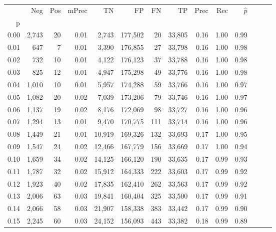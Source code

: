 \begin{tabular}{rrrrrrrrrrrrrr}
\toprule
{} &    Neg &  Pos & mPrec &       TN &       FP &      FN &      TP &  Prec &   Rec & $\hat{p}$ \\
p    &        &      &       &          &          &         &         &       &       &           \\
\midrule
0.00 &  2,743 &   20 &  0.01 &    2,743 &  177,502 &      20 &  33,805 &  0.16 &  1.00 &      0.99 \\
0.01 &    647 &    7 &  0.01 &    3,390 &  176,855 &      27 &  33,798 &  0.16 &  1.00 &      0.98 \\
0.02 &    732 &   10 &  0.01 &    4,122 &  176,123 &      37 &  33,788 &  0.16 &  1.00 &      0.98 \\
0.03 &    825 &   12 &  0.01 &    4,947 &  175,298 &      49 &  33,776 &  0.16 &  1.00 &      0.98 \\
0.04 &  1,010 &   10 &  0.01 &    5,957 &  174,288 &      59 &  33,766 &  0.16 &  1.00 &      0.97 \\
0.05 &  1,082 &   20 &  0.02 &    7,039 &  173,206 &      79 &  33,746 &  0.16 &  1.00 &      0.97 \\
0.06 &  1,137 &   19 &  0.02 &    8,176 &  172,069 &      98 &  33,727 &  0.16 &  1.00 &      0.96 \\
0.07 &  1,294 &   13 &  0.01 &    9,470 &  170,775 &     111 &  33,714 &  0.16 &  1.00 &      0.96 \\
0.08 &  1,449 &   21 &  0.01 &   10,919 &  169,326 &     132 &  33,693 &  0.17 &  1.00 &      0.95 \\
0.09 &  1,547 &   24 &  0.02 &   12,466 &  167,779 &     156 &  33,669 &  0.17 &  1.00 &      0.94 \\
0.10 &  1,659 &   34 &  0.02 &   14,125 &  166,120 &     190 &  33,635 &  0.17 &  0.99 &      0.93 \\
0.11 &  1,787 &   32 &  0.02 &   15,912 &  164,333 &     222 &  33,603 &  0.17 &  0.99 &      0.92 \\
0.12 &  1,923 &   40 &  0.02 &   17,835 &  162,410 &     262 &  33,563 &  0.17 &  0.99 &      0.92 \\
0.13 &  2,006 &   63 &  0.03 &   19,841 &  160,404 &     325 &  33,500 &  0.17 &  0.99 &      0.91 \\
0.14 &  2,066 &   58 &  0.03 &   21,907 &  158,338 &     383 &  33,442 &  0.17 &  0.99 &      0.90 \\
0.15 &  2,245 &   60 &  0.03 &   24,152 &  156,093 &     443 &  33,382 &  0.18 &  0.99 &      0.89 \\

\end{tabular}
